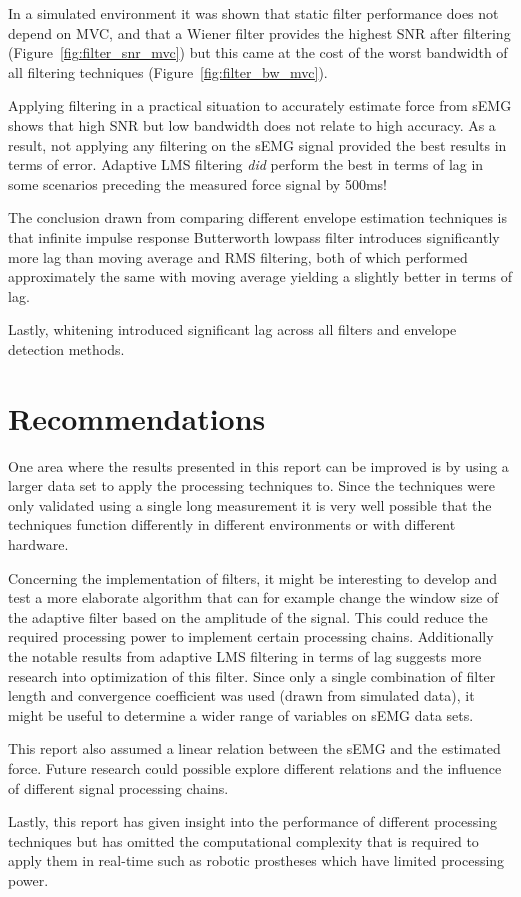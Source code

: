 In a simulated environment it was shown that static filter performance does not depend on MVC, and that a Wiener filter provides the highest SNR after filtering (Figure~\ref{fig:filter_snr_mvc}) but this came at the cost of the worst bandwidth of all filtering techniques (Figure~\ref{fig:filter_bw_mvc}).

Applying filtering in a practical situation to accurately estimate force from sEMG shows that high SNR but low bandwidth does not relate to high accuracy. As a result, not applying any filtering on the sEMG signal provided the best results in terms of error. Adaptive LMS filtering \textit{did} perform the best in terms of lag in some scenarios preceding the measured force signal by 500ms!

The conclusion drawn from comparing different envelope estimation techniques is that infinite impulse response Butterworth lowpass filter introduces significantly more lag than moving average and RMS filtering, both of which performed approximately the same with moving average yielding a slightly better in terms of lag.

Lastly, whitening introduced significant lag across all filters and envelope detection methods.

\section{Recommendations}
One area where the results presented in this report can be improved is by using a larger data set to apply the processing techniques to. Since the techniques were only validated using a single long measurement it is very well possible that the techniques function differently in different environments or with different hardware.

Concerning the implementation of filters, it might be interesting to develop and test a more elaborate algorithm that can for example change the window size of the adaptive filter based on the amplitude of the signal. This could reduce the required processing power to implement certain processing chains. Additionally the notable results from adaptive LMS filtering in terms of lag suggests more research into optimization of this filter. Since only a single combination of filter length and convergence coefficient was used (drawn from simulated data), it might be useful to determine a wider range of variables on sEMG data sets.

This report also assumed a linear relation between the sEMG and the estimated force. Future research could possible explore different relations and the influence of different signal processing chains.

Lastly, this report has given insight into the performance of different processing techniques but has omitted the computational complexity that is required to apply them in real-time such as robotic prostheses \cite{semg_application_prosthesis} which have limited processing power. 